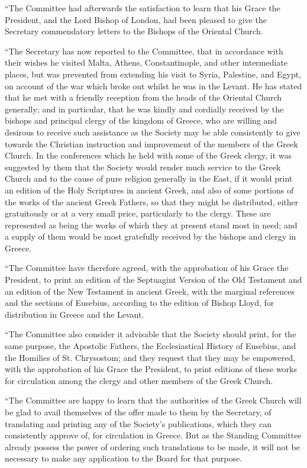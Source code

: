 ``The Committee had afterwards the satisfaction to
learn that his Grace the President, and the Lord Bishop of London, had
been pleased to give the Secretary commendatory letters to the Bishops
of the Oriental Church.

``The Secretary has now reported to the Committee,
that in accordance with their wishes he visited Malta, Athens,
Constantinople, and other intermediate places, but was prevented from
extending his visit to Syria, Palestine, and Egypt, on account of the
war which broke out whilst he was in the Levant. He has stated that he
met with a friendly reception from the heads of the Oriental Church
generally; and in particular, that he was kindly and cordially received
by the bishops and principal clergy of the kingdom of Greece, who are
willing and desirous to receive such assistance as the Society may be
able consistently to give towards the Christian instruction and
improvement of the members of the Greek Church. In the conferences which
he held with some of the Greek clergy, it was suggested by them that the
Society would render much service to the Greek Church and to the cause
of pure religion generally in the East, if it would print an edition of
the Holy Scriptures in ancient Greek, and also of some portions of the
works of the ancient Greek Fathers, so that they might be distributed,
either gratuitously or at a very small price, particularly to the
clergy. These are represented as being the works of which they at
present stand most in need; and a supply of them would be most
gratefully received by the bishops and clergy in Greece.

``The Committee have therefore agreed, with the
approbation of his Grace the President, to print an edition of the
Septuagint Version of the Old Testament and an edition of the New
Testament in ancient Greek, with the marginal references and the
sections of Eusebius, according to the edition of Bishop Lloyd, for
distribution in Greece and the Levant.

``The Committee also consider it advisable that the
Society should print, for the same purpose, the Apostolic Fathers, the
Ecclesiastical History of Eusebius, and the Homilies of St. Chrysostom;
and they request that they may be empowered, with the approbation of his
Grace the President, to print editions of these works for circulation
among the clergy and other members of the Greek Church.

``The Committee are happy to learn that the
authorities of the Greek Church will be glad to avail themselves of the
offer made to them by the Secretary, of translating and printing any of
the Society's publications, which they can consistently approve of, for
circulation in Greece. But as the Standing Committee already possess the
power of ordering such translations to be made, it will not be necessary
to make any application to the Board for that purpose.

